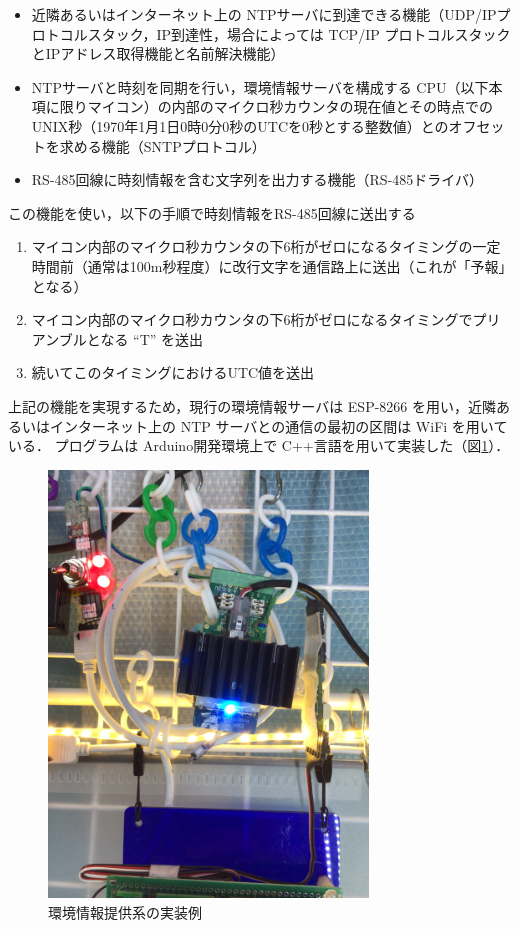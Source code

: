 \begin{itemize}
\item 近隣あるいはインターネット上の NTPサーバに到達できる機能（UDP/IPプロトコルスタック，IP到達性，場合によっては TCP/IP プロトコルスタックとIPアドレス取得機能と名前解決機能）
\item NTPサーバと時刻を同期を行い，環境情報サーバを構成する CPU（以下本項に限りマイコン）の内部のマイクロ秒カウンタの現在値とその時点でのUNIX秒（1970年1月1日0時0分0秒のUTCを0秒とする整数値）とのオフセットを求める機能（SNTPプロトコル）
\item RS-485回線に時刻情報を含む文字列を出力する機能（RS-485ドライバ）
\end{itemize}

この機能を使い，以下の手順で時刻情報をRS-485回線に送出する

\begin{enumerate}
\item マイコン内部のマイクロ秒カウンタの下6桁がゼロになるタイミングの一定時間前（通常は100m秒程度）に改行文字を通信路上に送出（これが「予報」となる）
\item マイコン内部のマイクロ秒カウンタの下6桁がゼロになるタイミングでプリアンブルとなる ``T'' を送出
\item 続いてこのタイミングにおけるUTC値を送出
\end{enumerate}

上記の機能を実現するため，現行の環境情報サーバは ESP-8266 を用い，近隣あるいはインターネット上の NTP サーバとの通信の最初の区間は WiFi を用いている．
プログラムは Arduino開発環境上で C++言語を用いて実装した（図\ref{hohno:RaspberryComPoTE-Z}）．\\


\begin{figure}[h]
\centering
\includegraphics[width=8.5cm, angle=270]{figspics/RaspberryComPoTE_figZ.png}
\caption{環境情報提供系の実装例}
\label{hohno:RaspberryComPoTE-Z}
\end{figure}

